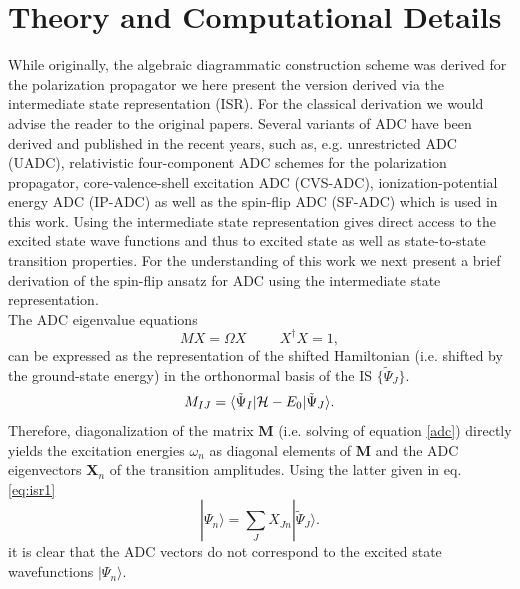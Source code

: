 \documentclass[aip,graphicx,amsmath,reprint]{revtex4-1}
\begin{document}
\section{Theory and Computational Details}
While originally, the algebraic diagrammatic construction scheme was derived for the polarization propagator \cite{Schirmer1982, Schirmer1995, Schirmer2004} we here present the version derived via the intermediate state representation (ISR).\cite{Schirmer2004} For the classical derivation we would advise the reader to the original papers.\cite{Schirmer1982, Schirmer1995, Schirmer2004} Several variants of ADC have been derived and published in the recent years, such as, e.g. unrestricted ADC (UADC)\cite{Starcke2009}, relativistic four-component ADC schemes for the polarization propagator\cite{Pernpointner2014}, core-valence-shell excitation ADC (CVS-ADC)\cite{Wenzel2014, Wenzel2014-2, Wenzel2015}, ionization-potential energy ADC (IP-ADC)\cite{Schneider2015} as well as the spin-flip ADC (SF-ADC)\cite{Lefrancois2015} which is used in this work. Using the intermediate state representation gives direct access to the excited state wave functions and thus to excited state as well as state-to-state transition properties. For the understanding of this work we next present a brief derivation of the spin-flip ansatz for ADC using the intermediate state representation.
\\
The ADC eigenvalue equations
\begin{equation}
MX =  \Omega X \hspace{1cm} X^\dagger X = 1,
\label{adc}
\end{equation}
can be expressed as the representation of the shifted Hamiltonian (i.e. shifted by the ground-state energy) in the orthonormal basis of the IS $\{\tilde{\Psi}_J\}$.
\begin{equation}
\label{shifted_H}
M_{IJ} = \langle\tilde{\Psi}_I|{\cal{H}}-E_0|\tilde{\Psi}_J\rangle.
\end{equation}
Therefore, diagonalization of the matrix {\bf{M}} (i.e. solving of equation \eqref{adc}) directly yields the excitation energies {\bf{$\omega_n$}} as diagonal elements of {\bf{M}} and the ADC eigenvectors {\bf{X$_n$}} of the transition amplitudes. Using the latter given in eq. \eqref{eq:isr1}
\begin{equation}
|\Psi_n\rangle = \sum_J X_{Jn}|\tilde{\Psi}_J\rangle.
\label{eq:isr1}
\end{equation}
it is clear that the ADC vectors do not correspond to the excited state wavefunctions $|\Psi_n\rangle$.
\end{document}
